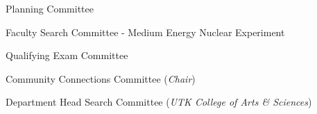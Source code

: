 \documentclass[11pt,letterpaper]{article}
\begin{document}
\begin{itemizetighter}
    \item Planning Committee 

    \item Faculty Search Committee - Medium Energy Nuclear Experiment 

    \item Qualifying Exam Committee 


    \item Community Connections Committee (\emph{Chair}) 

    \item Department Head Search Committee  (\emph{UTK College of Arts \& Sciences}) 
  \end{itemizetighter}







\end{document}
